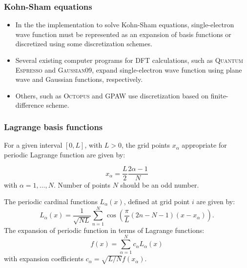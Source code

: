 \documentclass[10pt]{beamer}
\begin{document}
\begin{frame}
\frametitle{Kohn-Sham equations}

\begin{itemize}
\item In the the implementation to solve Kohn-Sham equations, single-electron wave function must be
  represented as an expansion of basis functions or discretized using
  some discretization schemes.
\item Several
  existing computer programs for DFT calculations, such as
  \textsc{Quantum Espresso} and \textsc{Gaussian09},
  expand single-electron wave function using plane wave and Gaussian functions, respectively.
\item Others, such as \textsc{Octopus} and GPAW use discretization based on finite-difference scheme.
\end{itemize}

\end{frame}



\begin{frame}
\frametitle{Lagrange basis functions}

For a given interval $[0,L]$, with $L>0$, the grid points $x_{\alpha}$
appropriate for periodic Lagrange function are given by:

\begin{equation}
x_{\alpha}=\frac{L}{2}\frac{2\alpha-1}{N}
\end{equation}
with $\alpha=1,\ldots,N$. Number of points $N$ should be an odd number.

The periodic cardinal functions $L_{\alpha}(x)$, defined
at grid point $i$ are given by:
\begin{equation}
L_{\alpha}(x)=\frac{1}{\sqrt{NL}}\sum_{n=1}^{N}\cos\left(\frac{\pi}{L}(2n-N-1)(x-x_{\alpha})\right).
\end{equation}
The expansion of periodic function in terms of Lagrange functions:
\begin{equation}
f(x)=\sum_{\alpha=1}^{N}c_{\alpha}L_{\alpha}(x)
\end{equation}
with expansion coefficients $c_{\alpha}=\sqrt{L/N}f(x_{\alpha})$.

\end{frame}
\end{document}
